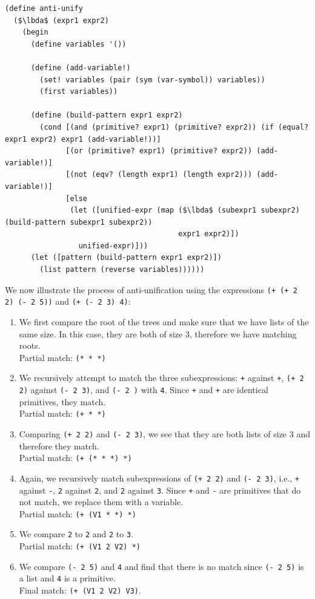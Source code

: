 \documentclass[a4paper,10pt]{article}
\newcommand{\lbda}{\color[rgb]{0,.3,.7} \lambda}
\begin{document}
\begin{lstlisting}[frame=trbl]
(define anti-unify
  ($\lbda$ (expr1 expr2)
    (begin
      (define variables '())

      (define (add-variable!)
        (set! variables (pair (sym (var-symbol)) variables))
        (first variables))
      
      (define (build-pattern expr1 expr2)
        (cond [(and (primitive? expr1) (primitive? expr2)) (if (equal? expr1 expr2) expr1 (add-variable!))]
              [(or (primitive? expr1) (primitive? expr2)) (add-variable!)]
              [(not (eqv? (length expr1) (length expr2))) (add-variable!)]
              [else
               (let ([unified-expr (map ($\lbda$ (subexpr1 subexpr2) (build-pattern subexpr1 subexpr2))
                                        expr1 expr2)])
                 unified-expr)]))
      (let ([pattern (build-pattern expr1 expr2)])
        (list pattern (reverse variables))))))
\end{lstlisting}

We now illustrate the process of anti-unification using the expressions \texttt{(+ (+ 2 2) (- 2 5))} and \texttt{(+ (- 2 3) 4)}:
\begin{enumerate}
\item We first compare the root of the trees and make sure that we have lists of the same size. In this case, they are both of size $3$, therefore we have matching roots. \\
  Partial match: \texttt{(* * *)}
\item We recursively attempt to match the three subexpressions: \texttt{+} against \texttt{+}, \texttt{(+ 2 2)} against \texttt{(- 2 3)}, and \texttt{(- 2 )} with \texttt{4}. Since \texttt{+} and \texttt{+} are identical primitives, they match. \\
  Partial match: \texttt{(+ * *)}
\item Comparing \texttt{(+ 2 2)} and \texttt{(- 2 3)}, we see that they are both lists of size 3 and therefore they match. \\
  Partial match: \texttt{(+ (* * *) *)}
\item Again, we recursively match subexpressions of \texttt{(+ 2 2)} and \texttt{(- 2 3)}, i.e., \texttt{+} against \texttt{-}, \texttt{2} against \texttt{2}, and \texttt{2} against \texttt{3}. Since \texttt{+} and \texttt{-} are primitives that do not match, we replace them with a variable. \\
  Partial match: \texttt{(+ (V1 * *) *)}
\item We compare \texttt{2} to \texttt{2} and \texttt{2} to \texttt{3}. \\
  Partial match: \texttt{(+ (V1 2 V2) *)}
\item We compare \texttt{(- 2 5)} and \texttt{4} and find that there is no match since \texttt{(- 2 5)} is a list and \texttt{4} is a primitive. \\
  Final match: \texttt{(+ (V1 2 V2) V3)}.
\end{enumerate}
\end{document}
